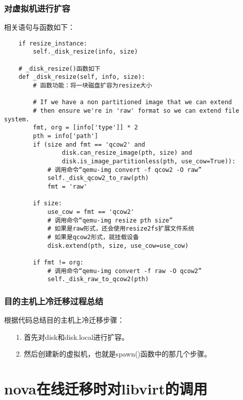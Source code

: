 \documentclass[a4paper,left=1.5cm,right=1.5cm,11pt]{article}
\begin{document}
\subsubsection{对虚拟机进行扩容}
	相关语句与函数如下：
	\begin{lstlisting}
	if resize_instance:
		self._disk_resize(info, size)

	# _disk_resize()函数如下
	def _disk_resize(self, info, size):
        # 函数功能：将一块磁盘扩容为resize大小

		# If we have a non partitioned image that we can extend
        # then ensure we're in 'raw' format so we can extend file system.
        fmt, org = [info['type']] * 2
        pth = info['path']
        if (size and fmt == 'qcow2' and
                disk.can_resize_image(pth, size) and
                disk.is_image_partitionless(pth, use_cow=True)):
			# 调用命令“qemu-img convert -f qcow2 -O raw”
            self._disk_qcow2_to_raw(pth)
            fmt = 'raw'

        if size:
            use_cow = fmt == 'qcow2'
			# 调用命令“qemu-img resize pth size”
			# 如果是raw形式，还会使用resize2fs扩展文件系统
			# 如果是qcow2形式，就挂载设备
            disk.extend(pth, size, use_cow=use_cow)

        if fmt != org:
            # 调用命令“qemu-img convert -f raw -O qcow2”
            self._disk_raw_to_qcow2(pth)
	\end{lstlisting}

\subsubsection{目的主机上冷迁移过程总结}
	根据代码总结目的主机上冷迁移步骤：
	\begin{itemize}
		\item[1.] 首先对disk和disk.local进行扩容。
		\item[2.] 然后创建新的虚拟机，也就是spawn()函数中的那几个步骤。
	\end{itemize}

\clearpage

\section{nova在线迁移时对libvirt的调用}
\end{document}
